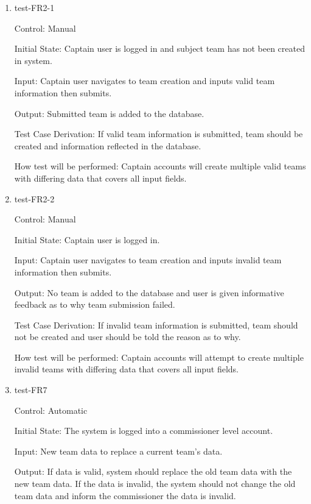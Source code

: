 \documentclass[12pt, titlepage]{article}
\begin{document}
\begin{enumerate}

  \item{test-FR2-1\\}

  Control: Manual
            
  Initial State: Captain user is logged in and subject team has not been 
  created in system.
            
  Input: Captain user navigates to team creation and inputs valid team 
  information then submits. 
            
  Output: Submitted team is added to the database.
  
  Test Case Derivation: If valid team information is submitted, team
  should be created and information reflected in the database.
  
  How test will be performed: Captain accounts will create multiple
  valid teams with differing data that covers all input fields.

  \item{test-FR2-2\\}

  Control: Manual
            
  Initial State: Captain user is logged in.
            
  Input: Captain user navigates to team creation and inputs invalid team 
  information then submits. 
            
  Output: No team is added to the database and user is given informative 
  feedback as to why team submission failed.
  
  Test Case Derivation: If invalid team information is submitted, team
  should not be created and user should be told the reason as to why.
  
  How test will be performed: Captain accounts will attempt to create 
  multiple invalid teams with differing data that covers all input fields. 

  \item{test-FR7\\}

  Control: Automatic

  Initial State: The system is logged into a commissioner level account.
            
  Input: New team data to replace a current team's data.
            
  Output: If data is valid, system should replace the old team data with the new
  team data. If the data is invalid, the system should not change the old team
  data and inform the commissioner the data is invalid.


\end{enumerate}
\end{document}

